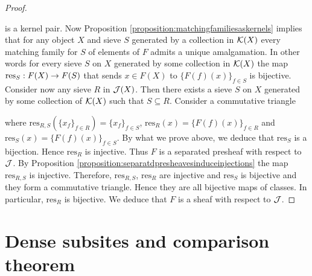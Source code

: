 \begin{proof}
\begin{center}
\end{center}
is a kernel pair. Now Proposition \ref{proposition:matchingfamiliesaskernels} implies that for any object $X$ and sieve $S$ generated by a collection in ${\mathcal K}(X)$ every matching family for $S$ of elements of $F$ admits a unique amalgamation. In other words for every sieve $S$ on $X$ generated by some collection in ${\mathcal K}(X)$ the map $\mathrm{res}_S:F(X)\rightarrow F(S)$ that sends $x\in F(X)$ to $\{F(f)(x)\}_{f\in S}$ is bijective. Consider now any sieve $R$ in ${\mathcal J}(X)$. Then there exists a sieve $S$ on $X$ generated by some collection of ${\mathcal K}(X)$ such that $S\subseteq R$. Consider a commutative triangle
\begin{center}
\end{center}
where $\mathrm{res}_{R,S}\left(\{x_f\}_{f\in R}\right)=\{x_f\}_{f\in S}$, $\mathrm{res}_{R}(x)=\{F(f)(x)\}_{f\in R}$ and $\mathrm{res}_{S}(x)=\{F(f)(x)\}_{f\in S}$. By what we prove above, we deduce that $\mathrm{res}_S$ is a bijection. Hence $\mathrm{res}_R$ is injective. Thus $F$ is a separated presheaf with respect to ${\mathcal J}$. By Proposition \ref{proposition:separatdpresheavesinduceinjections} the map $\mathrm{res}_{R,S}$ is injective. Therefore, $\mathrm{res}_{R,S}$, $\mathrm{res}_R$ are injective and $\mathrm{res}_S$ is bijective and they form a commutative triangle. Hence they are all bijective maps of classes. In particular, $\mathrm{res}_R$ is bijective. We deduce that $F$ is a sheaf with respect to ${\mathcal J}$.
\end{proof}

\section{Dense subsites and comparison theorem}

